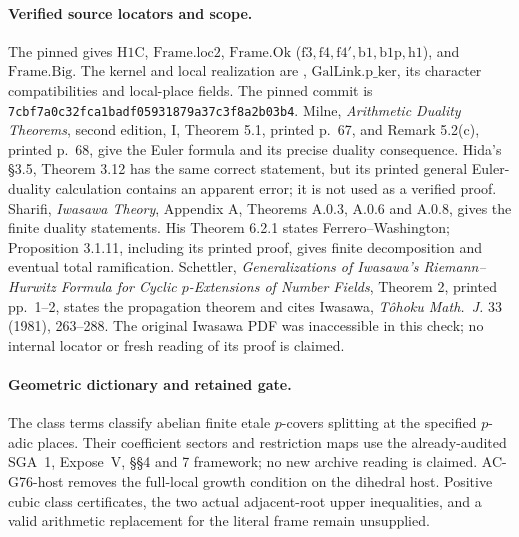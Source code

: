 \paragraph{Verified source locators and scope.}
The pinned  gives
\(\mathrm{H1C}\), \(\mathrm{Frame.loc2}\), \(\mathrm{Frame.Ok}\)
(\(\mathrm{f3,f4,f4',b1,b1p,h1}\)), and \(\mathrm{Frame.Big}\).
The kernel and local realization are
,
\(\mathrm{GalLink.p\_ker}\), its character compatibilities and local-place fields.
The pinned commit is \texttt{7cbf7a0c32fca1badf05931879a37c3f8a2b03b4}.
Milne, \emph{Arithmetic Duality Theorems}, second edition, I, Theorem 5.1,
printed p.\ 67, and Remark 5.2(c), printed p.\ 68, give the Euler formula
and its precise duality consequence. Hida's \S3.5, Theorem 3.12 has the
same correct statement, but its printed general Euler-duality calculation
contains an apparent error; it is not used as a verified proof.
Sharifi, \emph{Iwasawa Theory}, Appendix A, Theorems A.0.3, A.0.6 and A.0.8,
gives the finite duality statements. His Theorem 6.2.1 states
Ferrero--Washington; Proposition 3.1.11, including its printed proof,
gives finite decomposition and eventual total ramification.
Schettler, \emph{Generalizations of Iwasawa's Riemann--Hurwitz Formula for
Cyclic \(p\)-Extensions of Number Fields}, Theorem 2, printed pp.\ 1--2,
states the propagation theorem and cites Iwasawa,
\emph{T\^ohoku Math.\ J.} 33 (1981), 263--288.
The original Iwasawa PDF was inaccessible in this check; no internal
locator or fresh reading of its proof is claimed.

\paragraph{Geometric dictionary and retained gate.}
The class terms classify abelian finite etale \(p\)-covers splitting at the
specified \(p\)-adic places. Their coefficient sectors and restriction maps
use the already-audited SGA~1, Expose~V, \S\S4 and 7 framework; no new
archive reading is claimed. AC-G76-host removes the full-local growth
condition on the dihedral host. Positive cubic class certificates, the
two actual adjacent-root upper inequalities, and a valid arithmetic
replacement for the literal frame remain unsupplied.
